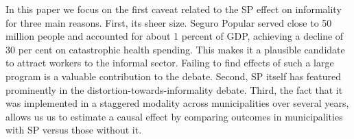 \documentclass[oneside,11pt]{article}
\begin{document}
In this paper we focus on the first caveat related to the SP effect on informality for three main reasons. First, its sheer size. Seguro Popular served close to 50 million people and accounted for about 1 percent of GDP, achieving a decline of 30 per cent on catastrophic health spending. This makes it a plausible candidate to attract workers to the informal sector. Failing to find effects of such a large program is a valuable contribution to the debate. Second, SP itself has featured prominently in the distortion-towards-informality debate. Third, the fact that it was implemented in a staggered modality across municipalities over several years, allows us us to estimate a causal effect by comparing outcomes in municipalities with SP versus those without it.


\end{document}
